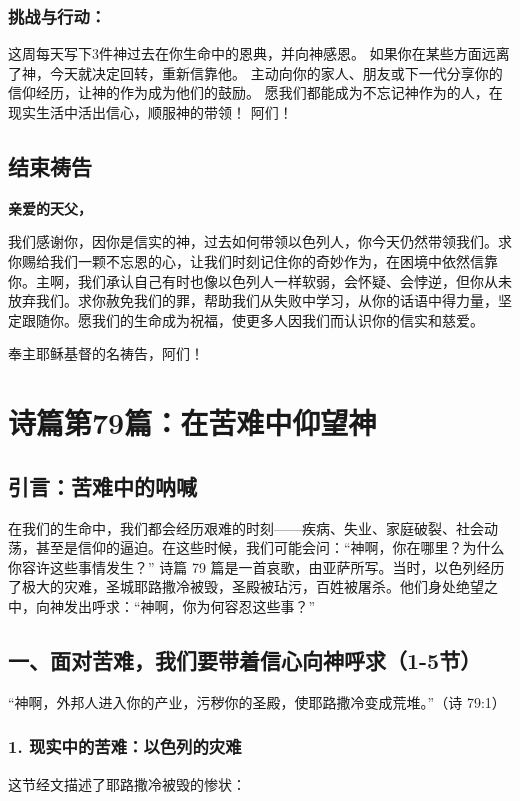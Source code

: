 \documentclass[a4paper, 12pt]{article}
\begin{document}
\subsubsection*{挑战与行动：}
这周每天写下3件神过去在你生命中的恩典，并向神感恩。
如果你在某些方面远离了神，今天就决定回转，重新信靠他。
主动向你的家人、朋友或下一代分享你的信仰经历，让神的作为成为他们的鼓励。
愿我们都能成为不忘记神作为的人，在现实生活中活出信心，顺服神的带领！ 阿们！
\subsection*{结束祷告}
\textbf{亲爱的天父，}

我们感谢你，因你是信实的神，过去如何带领以色列人，你今天仍然带领我们。求你赐给我们一颗不忘恩的心，让我们时刻记住你的奇妙作为，在困境中依然信靠你。主啊，我们承认自己有时也像以色列人一样软弱，会怀疑、会悖逆，但你从未放弃我们。求你赦免我们的罪，帮助我们从失败中学习，从你的话语中得力量，坚定跟随你。愿我们的生命成为祝福，使更多人因我们而认识你的信实和慈爱。

奉主耶稣基督的名祷告，阿们！
\newpage
\section{诗篇第79篇：在苦难中仰望神}
\subsection*{引言：苦难中的呐喊}
在我们的生命中，我们都会经历艰难的时刻——疾病、失业、家庭破裂、社会动荡，甚至是信仰的逼迫。在这些时候，我们可能会问：“神啊，你在哪里？为什么你容许这些事情发生？”
诗篇 79 篇是一首哀歌，由亚萨所写。当时，以色列经历了极大的灾难，圣城耶路撒冷被毁，圣殿被玷污，百姓被屠杀。他们身处绝望之中，向神发出呼求：“神啊，你为何容忍这些事？”

\subsection*{一、面对苦难，我们要带着信心向神呼求（1-5节）}
“神啊，外邦人进入你的产业，污秽你的圣殿，使耶路撒冷变成荒堆。”（诗 79:1）

\subsubsection*{1. 现实中的苦难：以色列的灾难}
这节经文描述了耶路撒冷被毁的惨状：
\end{document}
